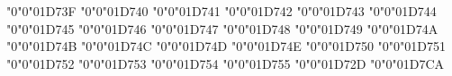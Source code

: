 {    \Umathchardef\kappa     "0"0"01D73F%
    \Umathchardef\lambda    "0"0"01D740%
    \Umathchardef\mu        "0"0"01D741%
    \Umathchardef\nu        "0"0"01D742%
    \Umathchardef\xi        "0"0"01D743%
    \Umathchardef\omicron   "0"0"01D744%
    \Umathchardef\pi        "0"0"01D745%
    \Umathchardef\rho       "0"0"01D746%
    \Umathchardef\varsigma  "0"0"01D747%
    \Umathchardef\sigma     "0"0"01D748%
    \Umathchardef\tau       "0"0"01D749%
    \Umathchardef\upsilon   "0"0"01D74A%
    \Umathchardef\varphi    "0"0"01D74B%
    \Umathchardef\chi       "0"0"01D74C%
    \Umathchardef\psi       "0"0"01D74D%
    \Umathchardef\omega     "0"0"01D74E%
    \Umathchardef\epsilon   "0"0"01D750%
    \Umathchardef\vartheta  "0"0"01D751%
    \Umathchardef\varkappa  "0"0"01D752%
    \Umathchardef\phi       "0"0"01D753%
    \Umathchardef\varrho    "0"0"01D754%
    \Umathchardef\varpi     "0"0"01D755%
    \Umathchardef\varTheta  "0"0"01D72D%
    \Umathchardef\digamma   "0"0"01D7CA%
    \relax
}

\everymathtt {%
}


\let\mit\it


\def\oldstyle{\fam1\relax\tenos\relax}


\def\cal{\fam0\relax\the\everymathcal\relax\tenit\relax}

